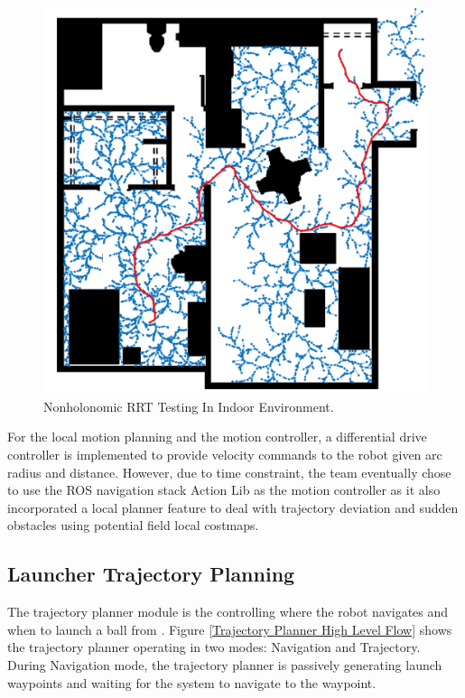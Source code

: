 \documentclass[11pt]{article}
\begin{document}
\begin{figure}[H]
    \centering
        \includegraphics[scale=.3, angle =0]{figures/rrt-5.png}
    \caption{Non\-holonomic RRT Testing In Indoor Environment.}
    \label{Non-holonomic RRT Testing In Indoor Environment}
\end{figure}

For the local motion planning and the motion controller, a differential drive controller is implemented to provide velocity commands to the robot given arc radius and distance. However, due to time constraint, the team eventually chose to use the ROS navigation stack Action Lib as the motion controller as it also incorporated a local planner feature to deal with trajectory deviation and sudden obstacles using potential field local costmaps. 

\subsection{Launcher Trajectory Planning}
The trajectory planner module is the controlling where the robot navigates and when to launch a ball from . Figure \ref{Trajectory Planner High Level Flow} shows the trajectory planner operating in two modes: Navigation and Trajectory. During Navigation mode, the trajectory planner is passively generating launch waypoints and waiting for the system to navigate to the waypoint. 
\end{document}
